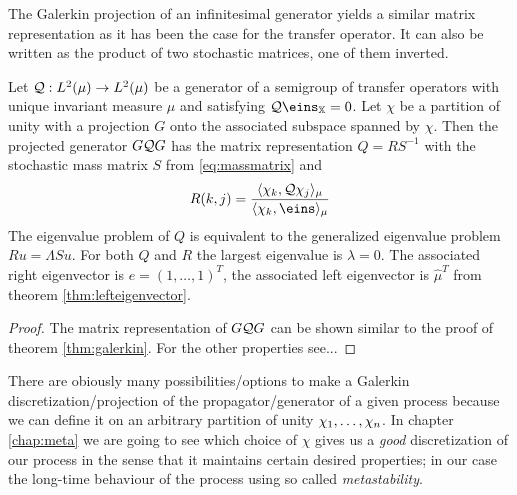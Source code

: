 The Galerkin projection of an infinitesimal generator yields a similar matrix representation as it has been the case for the transfer operator. It can also be written as the product of two stochastic matrices, one of them inverted.

\begin{thm}
Let $\mathcal{Q}: L^2(\mu) \rightarrow L^2(\mu)$ be a generator of a semigroup of transfer operators with unique invariant measure $\mu$ and satisfying $\Qcal\eins_\X = 0$.
Let $\chi$ be a partition of unity with a projection $G$ onto the associated subspace spanned by $\chi$.
Then the projected generator $G \mathcal{Q} G$ has the matrix representation $Q = RS^{-1}$ with the stochastic mass matrix $S$ from \eqref{eq:massmatrix} and 
\begin{equation*}
R(k,j) = \frac{\langle \chi_k, \Qcal\chi_j \rangle_\mu}{\langle \chi_k, \eins \rangle_\mu}
\end{equation*}
The eigenvalue problem of $Q$ is equivalent to the generalized eigenvalue problem $Ru = \Lambda Su$.
For both $Q$ and $R$ the largest eigenvalue is $\lambda = 0$. The associated right eigenvector is $e=(1,\dots,1)^T$, the associated left eigenvector is $\hat{\mu}^T$ from theorem \ref{thm:lefteigenvector}.
\end{thm}
\begin{proof}
The matrix representation of $G\mathcal{Q} G$ can be shown similar to the proof of theorem \ref{thm:galerkin}. For the other properties see...
\end{proof}

There are obiously many possibilities/options to make a Galerkin discretization/projection of the propagator/generator of a given process because we can define it on an arbitrary partition of unity $\chi_1,\dots,\chi_n$.
In chapter \ref{chap:meta} we are going to see which choice of $\chi$ gives us a \textit{good} discretization of our process in the sense that it maintains certain desired properties; in our case the long-time behaviour of the process using so called \textit{metastability}.
